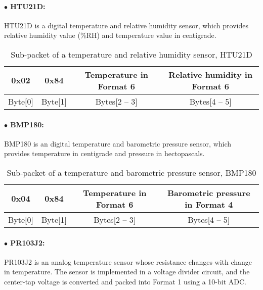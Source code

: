 \paragraph{$\bullet$ HTU21D:}
HTU21D is a digital temperature and relative humidity sensor, which provides
relative humidity value (\%RH) and temperature value in centigrade.
\\

\begin{table}[h!]
    \centering
    \caption{Sub-packet of a temperature and relative humidity sensor, HTU21D}
    \begin{tabular}{|c|c|c|c|}
        \hline
        \rowcolor{black!8}
        \textbf{0x02} & \textbf{0x84} & \textbf{Temperature in Format 6} & \textbf{Relative humidity in Format 6}\\
        \hline
        Byte[0] & Byte[1] & Bytes[2 -- 3] & Bytes[4 -- 5] \\ \hline
    \end{tabular}
\end{table}


\paragraph{$\bullet$ BMP180:}

BMP180 is an digital temperature and barometric pressure sensor,
which provides temperature in centigrade and pressure in hectopascals.
\\


\begin{table}[h!]
    \centering
    \caption{Sub-packet of a temperature and barometric pressure sensor, BMP180}
    \begin{tabular}{|c|c|c|c|}
        \hline
        \rowcolor{black!8}
        \textbf{0x04} & \textbf{0x84} & \textbf{Temperature in Format 6} & \textbf{Barometric pressure in Format 4}\\
        \hline
        Byte[0] & Byte[1] & Bytes[2 -- 3] & Bytes[4 -- 5] \\ \hline
    \end{tabular}
\end{table}


\paragraph{$\bullet$ PR103J2:}

PR103J2 is an analog temperature sensor whose resistance changes with change in temperature.
The sensor is implemented in a voltage divider circuit, and the center-tap voltage is converted and packed into Format 1 using a 10-bit ADC.



